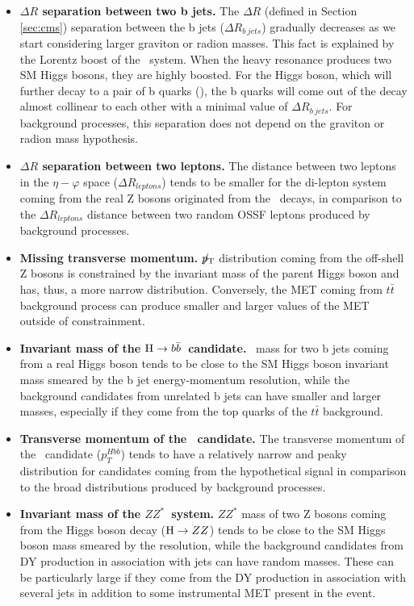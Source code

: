 \begin{itemize}

\item{\bfseries $\Delta R$ separation between two b jets.}
The $\Delta R$ (defined in Section \ref{sec:cms}) separation between the b jets ($\Delta R_{b\ jets}$) gradually decreases as we start considering larger graviton or radion masses. This fact is explained by the Lorentz boost of the \HBB~system. When the heavy resonance produces two SM Higgs bosons, they are highly boosted. For the Higgs boson, which will further decay to a pair of b quarks (\HBB), the b quarks will come out of the decay almost collinear to each other with a minimal value of $\Delta R_{b\ jets}$. For background processes, this separation does not depend on the graviton or radion mass hypothesis. 

\item{\bfseries $\Delta R$ separation between two leptons.}
The distance between two leptons in the $\eta - \varphi$ space ($\Delta R_{leptons}$) tends to be smaller for the di-lepton system coming from the real Z bosons originated from the \HZZ~decays, in comparison to the $\Delta R_{leptons}$ distance between two random OSSF leptons produced by background processes. 

\item{\bfseries Missing transverse momentum.}
${p}_\mathrm{T}\hspace{-1.02em}/\kern 0.5em$ distribution coming from the off-shell Z bosons is constrained by the invariant mass of the parent Higgs boson and has, thus, a more narrow distribution. Conversely, the MET coming from $t\bar{t}$ background process can produce smaller and larger values of the MET outside of constrainment. 

\item{\bfseries Invariant mass of the $\mathrm{H}\to b\bar{b}$~candidate.} 
\HBB~mass for two b jets coming from a real Higgs boson tends to be close to the SM Higgs boson invariant mass smeared by the b jet energy-momentum resolution, while the background candidates from unrelated b jets can have smaller and larger masses, especially if they come from the top quarks of the $t\bar{t}$ background.

\item{\bfseries Transverse momentum of the \HBB~candidate.} 
The transverse momentum of the \HBB~candidate ($p_T^{Hbb}$) tends to have a relatively narrow and peaky distribution for candidates coming from the hypothetical signal in comparison to the broad distributions produced by background processes. 

\item{\bfseries Invariant mass of the $ZZ^*$~system.} 
$ZZ^*$ mass of two Z bosons coming from the Higgs boson decay ($\mathrm{H}\rightarrow ZZ$) tends to be close to the SM Higgs boson mass smeared by the \PTslash resolution, while the background candidates from DY production in association with jets can have random masses. These can be particularly large if they come from the DY production in association with several jets in addition to some instrumental MET present in the event.


\end{itemize}
